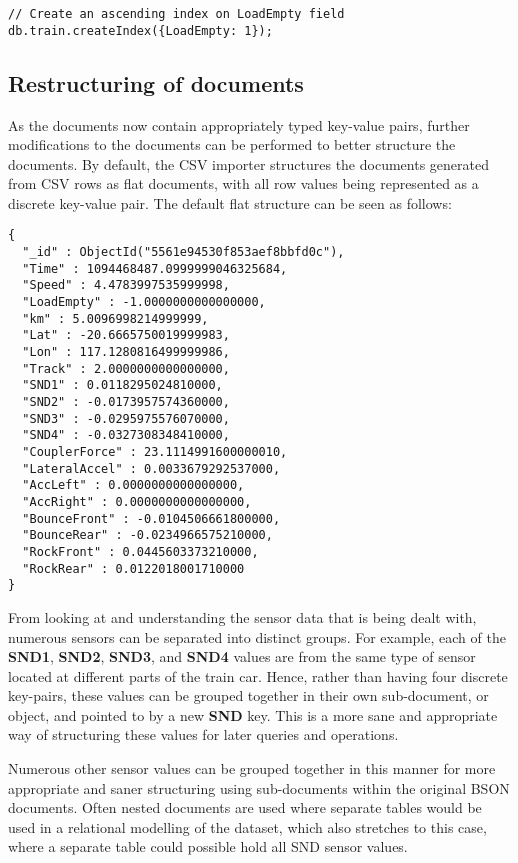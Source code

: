 \documentclass[a4paper,11pt]{article}
\begin{document}
\begin{lstlisting}
// Create an ascending index on LoadEmpty field
db.train.createIndex({LoadEmpty: 1});
\end{lstlisting}



\subsection{Restructuring of documents} %
\label{sub:restructuring_of_documents}

As the documents now contain appropriately typed key-value pairs, further modifications to the documents can be performed
to better structure the documents. By default, the CSV importer structures the documents generated from CSV rows as flat
documents, with all row values being represented as a discrete key-value pair. The default flat structure can be seen as
follows:

\begin{lstlisting}
{
  "_id" : ObjectId("5561e94530f853aef8bbfd0c"),
  "Time" : 1094468487.0999999046325684,
  "Speed" : 4.4783997535999998,
  "LoadEmpty" : -1.0000000000000000,
  "km" : 5.0096998214999999,
  "Lat" : -20.6665750019999983,
  "Lon" : 117.1280816499999986,
  "Track" : 2.0000000000000000,
  "SND1" : 0.0118295024810000,
  "SND2" : -0.0173957574360000,
  "SND3" : -0.0295975576070000,
  "SND4" : -0.0327308348410000,
  "CouplerForce" : 23.1114991600000010,
  "LateralAccel" : 0.0033679292537000,
  "AccLeft" : 0.0000000000000000,
  "AccRight" : 0.0000000000000000,
  "BounceFront" : -0.0104506661800000,
  "BounceRear" : -0.0234966575210000,
  "RockFront" : 0.0445603373210000,
  "RockRear" : 0.0122018001710000
}
\end{lstlisting}

From looking at and understanding the
sensor data that is being dealt with, numerous sensors can be separated into distinct groups. For example, each of the
\textbf{SND1}, \textbf{SND2}, \textbf{SND3}, and \textbf{SND4} values are from the same type of sensor located at different
parts of the train car. Hence, rather than having four discrete key-pairs, these values can be grouped together in their
own sub-document, or object, and pointed to by a new \textbf{SND} key. This is a more sane and appropriate way of
structuring these values for later queries and operations.

Numerous other sensor values can be grouped together in this manner for more appropriate and saner structuring using
sub-documents within the original BSON documents. Often nested documents are used where separate tables would be used in
a relational modelling of the dataset, which also stretches to this case, where a separate table could possible hold all
SND sensor values.
\end{document}
